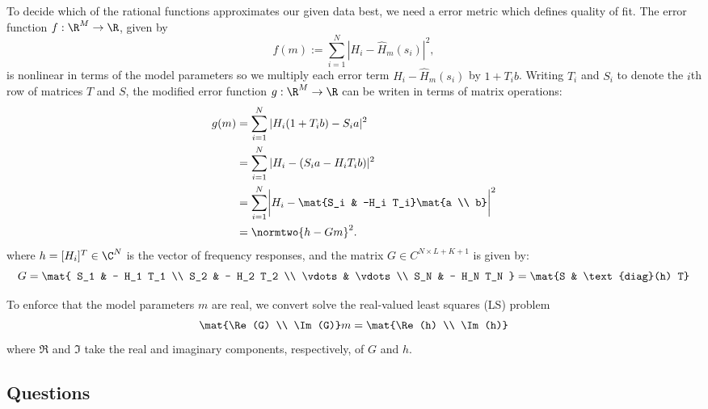\documentclass{homework}
\begin{document}
To decide which of the rational functions approximates our given data best,
we need a error metric which defines quality of fit. The error function
$f: \R^M \to \R$, given by
\begin{equation*}
    f(m) := \sum_{i=1}^{N} |H_i - \hat{H}_m(s_i)|^2,
\end{equation*}
is nonlinear in terms of the model parameters so we multiply each error
term $H_i - \hat{H}_m(s_i)$ by $1 + T_i b$. Writing $T_i$ and $S_i$ to denote
the $i$th row of matrices $T$ and $S$, the modified error function
$g: \R^M \to \R$ can be writen in terms of matrix operations:
\begin{align*}
    g(m) &= \sum_{i=1}^{N} |H_i(1 + T_i b) - S_i a |^2 \\
        &= \sum_{i=1}^{N} |H_i - (S_i a - H_i T_i b)|^2 \\
        &= \sum_{i=1}^{N} \biggl|H_i - \mat{S_i &  -H_i T_i} \mat{a \\ b}\biggr|^2 \\
        &= \normtwo{h - Gm}^2.
\end{align*}
where $h = [H_i]^T \in \C^N$ is the vector of frequency responses, and the matrix
$G \in C^{N \times L + K + 1}$ is given by:
\begin{equation}
    G = \mat{
        S_1 & - H_1 T_1 \\
        S_2 & - H_2 T_2 \\
        \vdots & \vdots \\
        S_N & - H_N T_N
    } = \mat{S & \text{diag}(h) T}
    \label{eq:G-matrix}
\end{equation}


To enforce that the model parameters
$m$ are real, we convert solve the real-valued least squares (LS) problem
\begin{equation}
    \mat{\Re (G) \\ \Im(G)} m = \mat{\Re(h) \\ \Im(h)}
    \label{eq:least-squares}
\end{equation}
where $\Re$ and $\Im$ take the real and imaginary components, respectively, of $G$
and $h$.


\subsection{Questions}
\label{sect:questions}
\end{document}
